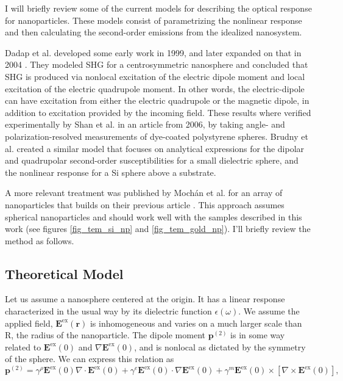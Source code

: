 I will briefly review some of the current models for describing the optical response for nanoparticles. These models consist of parametrizing the nonlinear response and then calculating the second-order emissions from the idealized nanosystem.

Dadap et al. \cite{dadap1999second} developed some early work in 1999, and later expanded on that in 2004 \cite{dadap2004theory}. They modeled SHG for a centrosymmetric nanosphere and concluded that SHG is produced via nonlocal excitation of the electric dipole moment and local excitation of the electric quadrupole moment. In other words, the electric-dipole can have excitation from either the electric quadrupole or the magnetic dipole, in addition to excitation provided by the incoming field. These results where verified experimentally by Shan et al. \cite{shan2006experimental} in an article from 2006, by taking angle- and polarization-resolved measurements of dye-coated polystyrene spheres. Brudny et al. \cite{brudny2000second} created a similar model that focuses on analytical expressions for the dipolar and quadrupolar second-order susceptibilities for a small dielectric sphere, and the nonlinear response for a Si sphere above a substrate.    

A more relevant treatment was published by Moch\'an et al. for an array of nanoparticles \cite{mochán2003second} that builds on their previous article \cite{brudny2000second}. This approach assumes spherical nanoparticles and should work well with the samples described in this work (see figures \ref{fig_tem_si_np} and \ref{fig_tem_gold_np}). I'll briefly review the method as follows.

\subsection{Theoretical Model}\label{mochan}
Let us assume a nanosphere centered at the origin. It has a linear response characterized in the usual way by its dielectric function $\epsilon(\omega)$. We assume the applied field, $\mathbf{E}^{\text{ex}}(\mathbf{r})$ is inhomogeneous and varies on a much larger scale than R, the radius of the nanoparticle. The dipole moment $\mathbf{p}^{(2)}$ is in some way related to $\mathbf{E}^{\text{ex}}(0)$ and $\nabla\mathbf{E}^{\text{ex}}(0)$, and is nonlocal as dictated by the symmetry of the sphere. We can express this relation as
\begin{equation}
\mathbf{p}^{(2)} = \gamma^{\rho}\mathbf{E}^{\text{ex}}(0)\nabla\cdot\mathbf{E}^{\text{ex}}(0) + \gamma^{e}\mathbf{E}^{\text{ex}}(0)\cdot\nabla\mathbf{E}^{\text{ex}}(0) + \gamma^{m}\mathbf{E}^{\text{ex}}(0)\times\left[\nabla\times\mathbf{E}^{\text{ex}}(0)\right],
\end{equation}

